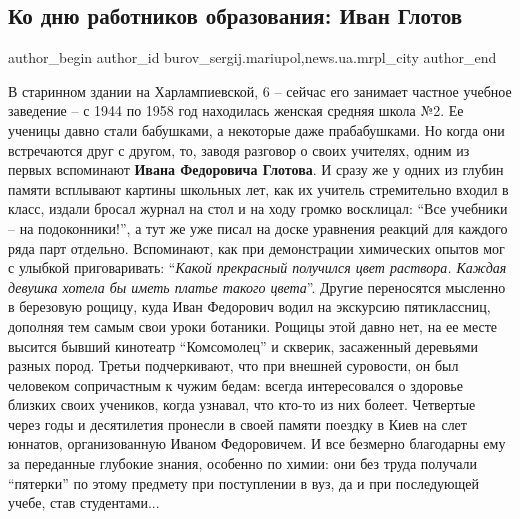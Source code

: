  
 
 
 
 
 
\subsection{Ко дню работников образования: Иван Глотов}
\label{sec:05_10_2019.stz.news.ua.mrpl_city.1.ivan_glotov}
 
\ifcmt
 author_begin
   author_id burov_sergij.mariupol,news.ua.mrpl_city
 author_end
\fi

В старинном здании на Харлампиевской, 6 – сейчас его занимает частное учебное
заведение – с 1944 по 1958 год находилась женская средняя школа №2. Ее ученицы
давно стали бабушками, а некоторые даже прабабушками. Но когда они встречаются
друг с другом, то, заводя разговор о своих учителях, одним из первых вспоминают
\textbf{Ивана Федоровича Глотова}. И сразу же у одних из глубин памяти всплывают картины
школьных лет, как их учитель стремительно входил в класс, издали бросал журнал
на стол и на ходу громко восклицал: \enquote{Все учебники – на подоконники!}, а тут же
уже писал на доске уравнения реакций для каждого ряда парт отдельно.
Вспоминают, как при демонстрации химических опытов мог с улыбкой приговаривать:
\enquote{\em Какой прекрасный получился цвет раствора. Каждая девушка хотела бы иметь
платье такого цвета}. Другие переносятся мысленно в березовую рощицу, куда Иван
Федорович водил на экскурсию пятиклассниц, дополняя тем самым свои уроки
ботаники. Рощицы этой давно нет, на ее месте высится бывший кинотеатр
\enquote{Комсомолец} и скверик, засаженный деревьями разных пород. Третьи подчеркивают,
что при внешней суровости, он был человеком сопричастным к чужим бедам: всегда
интересовался о здоровье близких своих учеников, когда узнавал, что кто-то из
них болеет. Четвертые через годы и десятилетия пронесли в своей памяти поездку
в Киев на слет юннатов, организованную Иваном Федоровичем. И все безмерно
благодарны ему за переданные глубокие знания, особенно по химии: они без труда
получали \enquote{пятерки} по этому предмету при поступлении в вуз, да и при
последующей учебе, став студентами...

